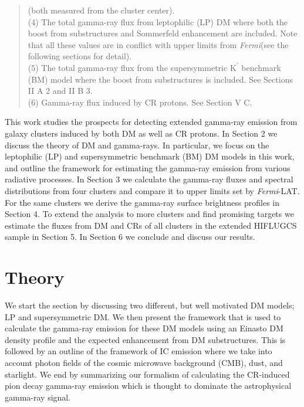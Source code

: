 \documentclass[10pt,aps,pra,reprint,amsmath,amsfonts,amssymb,showpacs,nofootinbib,floatfix]{revtex4-1}
\newcommand{\Fermi}{{\em Fermi}\xspace}
\newcommand{\rmn}{\mathrm}
\newcommand{\Kp}{\rmn{K}^\prime}
\begin{document}
\begin{table}
\begin{minipage}{2.0\columnwidth}
\begin{quote}
{  (both measured from the cluster center).}\\
  (4) The total gamma-ray flux from leptophilic (LP) DM where both the
  boost from substructures and Sommerfeld enhancement are
  included. Note that all these values are in conflict with upper limits from
  \Fermi (see the following sections for detail).\\
  (5) The total gamma-ray flux from the supersymmetric $\Kp$ benchmark (BM) 
  model where the boost from substructures is included. See Sections II A 2 and II B 3.\\
  (6) Gamma-ray flux induced by CR protons. See Section V C. 
 \label{tab:flux_tab}
  \end{quote}
\end{minipage}
\end{table} 

This work studies the prospects for detecting extended gamma-ray
emission from galaxy clusters induced by both DM as well as CR
protons. In Section 2 we discuss the theory of DM and gamma-rays. In
particular, we focus on the leptophilic (LP) and supersymmetric
benchmark (BM) DM models in this work, and outline the framework
for estimating the gamma-ray emission from various radiative
processes. In Section 3 we calculate the gamma-ray fluxes and spectral
distributions from four clusters and compare it to upper limits set by
\Fermi-LAT. For the same clusters we derive the gamma-ray surface
brightness profiles in Section 4. To extend the analysis to more
clusters and find promising targets we estimate the fluxes from DM and
CRs of all clusters in the extended HIFLUGCS sample in Section 5. In
Section 6 we conclude and discuss our results.

\section{Theory}
\label{sect:theory}
We start the section by discussing two different, but well motivated
DM models; LP and supersymmetric DM. We then present the framework
that is used to calculate the gamma-ray emission for these DM models
using an Einasto DM density profile and the expected enhancement from
DM substructures. This is followed by an outline of the framework of
IC emission where we take into account photon fields of the cosmic
microwave background (CMB), dust, and starlight. We end by summarizing
our formalism of calculating the CR-induced pion decay gamma-ray
emission which is thought to dominate the astrophysical gamma-ray
signal.
\end{document}
